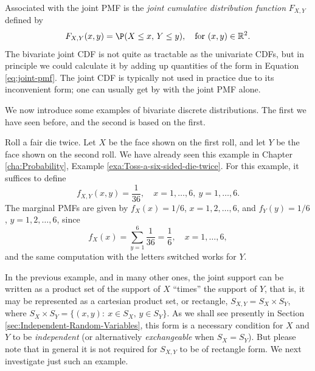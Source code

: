 \documentclass[captions=tableheading]{scrbook}
\begin{document}
Associated with the joint PMF is the \emph{joint cumulative distribution function} \(F_{X,Y}\) defined by
\[
F_{X,Y}(x,y)=\P(X\leq x,\, Y\leq y),\quad\mbox{for }(x,y)\in\mathbb{R}^{2}.
\]
The bivariate joint CDF is not quite as tractable as the univariate CDFs, but in principle we could calculate it by adding up quantities of the form in Equation \ref{eq:joint-pmf}. The joint CDF is typically not used in practice due to its inconvenient form; one can usually get by with the joint PMF alone.

We now introduce some examples of bivariate discrete distributions. The first we have seen before, and the second is based on the first.

\begin{example}
\label{exa:toss-two-dice-joint-pmf}

Roll a fair die twice. Let \(X\) be the face shown on the first roll, and let \(Y\) be the face shown on the second roll. We have already seen this example in Chapter \ref{cha:Probability}, Example \ref{exa:Toss-a-six-sided-die-twice}. For this example, it suffices to define
\[
f_{X,Y}(x,y)=\frac{1}{36},\quad x=1,\ldots,6,\ y=1,\ldots,6.
\]
The marginal PMFs are given by \(f_{X}(x)=1/6\), \(x=1,2,\ldots,6\), and \(f_{Y}(y)=1/6\), \(y=1,2,\ldots,6\), since
\[
f_{X}(x)=\sum_{y=1}^{6}\frac{1}{36}=\frac{1}{6},\quad x=1,\ldots,6,
\]
and the same computation with the letters switched works for \(Y\). 
\end{example}


In the previous example, and in many other ones, the joint support can be written as a product set of the support of \(X\) ``times'' the support of \(Y\), that is, it may be represented as a cartesian product set, or rectangle, \(S_{X,Y}=S_{X}\times S_{Y}\), where \(S_{X} \times S_{Y}= \{ (x,y):\ x\in S_{X},\, y\in S_{Y} \} \). As we shall see presently in Section \ref{sec:Independent-Random-Variables}, this form is a necessary condition for \(X\) and \(Y\) to be \emph{independent} (or alternatively \emph{exchangeable} when \(S_{X}=S_{Y}\)). But please note that in general it is not required for \(S_{X,Y}\) to be of rectangle form. We next investigate just such an example.
\end{document}
